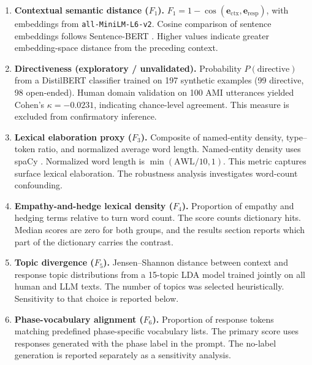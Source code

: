 \documentclass[11pt]{article}
\begin{document}
\begin{enumerate}
\item \textbf{Contextual semantic distance ($F_1$).} $F_1 = 1 - \cos(\mathbf{e}_{\text{ctx}}, \mathbf{e}_{\text{resp}})$, with embeddings from \texttt{all-MiniLM-L6-v2}. Cosine comparison of sentence embeddings follows Sentence-BERT \citep{reimers2019}. Higher values indicate greater embedding-space distance from the preceding context.

\item \textbf{Directiveness (exploratory / unvalidated).} Probability $P(\text{directive})$ from a DistilBERT classifier \citep{sanh2019distilbert} trained on 197 synthetic examples (99 directive, 98 open-ended). Human domain validation on 100 AMI utterances yielded Cohen's $\kappa = -0.0231$, indicating chance-level agreement. This measure is excluded from confirmatory inference.

\item \textbf{Lexical elaboration proxy ($F_3$).} Composite of named-entity density, type--token ratio, and normalized average word length. Named-entity density uses spaCy \citep{spacy2017}. Normalized word length is $\min(\mathrm{AWL}/10, 1)$. This metric captures surface lexical elaboration. The robustness analysis investigates word-count confounding.

\item \textbf{Empathy-and-hedge lexical density ($F_4$).} Proportion of empathy and hedging terms relative to turn word count. The score counts dictionary hits. Median scores are zero for both groups, and the results section reports which part of the dictionary carries the contrast.

\item \textbf{Topic divergence ($F_5$).} Jensen--Shannon distance between context and response topic distributions from a 15-topic LDA model \citep{blei2003lda} trained jointly on all human and LLM texts. The number of topics was selected heuristically. Sensitivity to that choice is reported below.

\item \textbf{Phase-vocabulary alignment ($F_6$).} Proportion of response tokens matching predefined phase-specific vocabulary lists. The primary score uses responses generated with the phase label in the prompt. The no-label generation is reported separately as a sensitivity analysis.
\end{enumerate}
\end{document}
